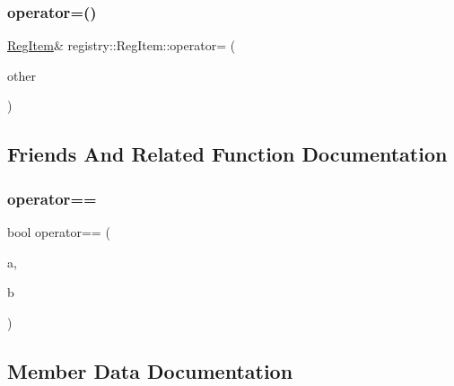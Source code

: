 \mbox{\label{classregistry_1_1RegItem_aff2e55eccdb5fb446dcadbbbf5cb04ca}} 
\subsubsection{\texorpdfstring{operator=()}{operator=()}\hspace{0.1cm}{\footnotesize\ttfamily [2/2]}}
{\footnotesize\ttfamily \hyperlink{classregistry_1_1RegItem}{Reg\+Item}\& registry\+::\+Reg\+Item\+::operator= (\begin{DoxyParamCaption}\item[{\hyperlink{classregistry_1_1RegItem}{Reg\+Item} \&\&}]{other }\end{DoxyParamCaption})\hspace{0.3cm}{\ttfamily [inline]}}



\subsection{Friends And Related Function Documentation}
\mbox{\label{classregistry_1_1RegItem_af3b610d326e264953225a12b91289737}} 
\subsubsection{\texorpdfstring{operator==}{operator==}}
{\footnotesize\ttfamily bool operator== (\begin{DoxyParamCaption}\item[{\hyperlink{classregistry_1_1RegItem}{Reg\+Item} const \&}]{a,  }\item[{\hyperlink{classregistry_1_1RegItem}{Reg\+Item} const \&}]{b }\end{DoxyParamCaption})\hspace{0.3cm}{\ttfamily [friend]}}



\subsection{Member Data Documentation}
\mbox{\label{classregistry_1_1RegItem_aa8a85387cb5e35272674075fb73dd01e}} 
